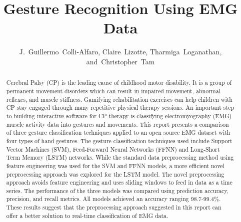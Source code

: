 \documentclass[journal]{IEEEtran}
\begin{document}
%
\title{Gesture Recognition Using EMG Data}
%
%
%

\author{
	J.~Guillermo~Colli-Alfaro, Claire~Lizotte, Tharmiga~Loganathan, and~Christopher~Tam%

}





\maketitle

\begin{abstract}
Cerebral Palsy (CP) is the leading cause of childhood motor disability. It is a group of permanent movement disorders which can result in impaired movement, abnormal reflexes, and muscle stiffness. Gamifying rehabilitation exercises can help children with CP stay engaged through many repetitive physical therapy sessions. An important step to building interactive software for CP therapy is classifying electromyography (EMG) muscle activity data into gestures and movements. This report presents a comparison of three gesture classification techniques applied to an open source EMG dataset with four types of hand gestures. The gesture classification techniques used include Support Vector Machines (SVM), Feed-Forward Neural Networks (FFNN) and Long-Short Term Memory (LSTM) networks. While the standard data preprocessing method using feature engineering was used for the SVM and FFNN models, a more efficient novel preprocessing approach was explored for the LSTM model. The novel preprocessing approach avoids feature engineering and uses sliding windows to feed in data as a time series. The performance of the three models was compared using prediction accuracy, precision, and recall metrics. All models achieved an accuracy ranging 98.7-99.4\%. These results suggest that the preprocessing approach suggested in this report can offer a better solution to real-time classification of EMG data.

\end{abstract}
\end{document}
